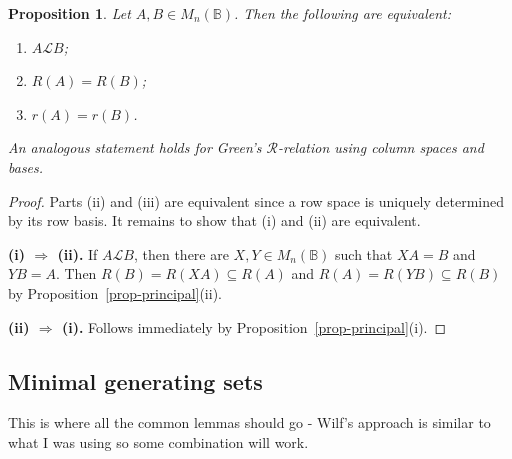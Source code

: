 \documentclass[11pt]{article}
\newtheorem{prop}[thm]{Proposition}
\numberwithin{equation}{section}
\newcommand{\set}[2]{\ensuremath{\{#1 : #2 \}}}
\newcommand{\B}{\mathbb{B}}
\newcommand{\Bn}{M_n(\B)}
\renewcommand{\L}{\mathscr{L}}
\newcommand{\R}{\mathscr{R}}
\newcommand{\D}{\mathscr{D}}
\newcommand{\N}{\mathbb{N}}
\begin{document}

\begin{prop} 
  Let $A, B \in \Bn$. Then the following are equivalent:
  \begin{enumerate}[label=\roman*]
    \item 
      $A \L B$;

    \item 
      $R(A) = R(B)$;

    \item 
      $r(A) = r(B)$.
  \end{enumerate}
  An analogous statement holds for Green's $\R$-relation using column spaces
  and bases. 
\end{prop}
\begin{proof}
  Parts (ii) and (iii) are equivalent since a row space is uniquely determined
  by its row basis. It remains to show that (i) and (ii) are
  equivalent.\bigskip

  \textbf{(i) $\Rightarrow$ (ii).} 
  If $A \L B$, then there are 
  $X, Y \in \Bn$ such that $XA = B$ and $YB = A$. Then $R(B) = R(XA) \subseteq
  R(A)$ and $R(A) = R(YB) \subseteq R(B)$ by
  Proposition~\ref{prop-principal}(ii).
  \bigskip

  \textbf{(ii) $\Rightarrow$ (i).} Follows immediately by
  Proposition~\ref{prop-principal}(i). 
\end{proof}

\subsection{Minimal generating sets}
This is where all the common lemmas should go - Wilf's approach is similar
to what I was using so some combination will work.

%
%
\end{document}

